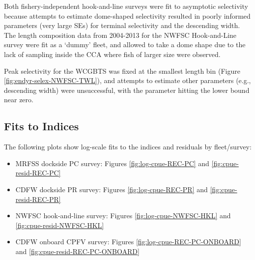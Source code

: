 \documentclass[11pt,
  english,
  a4paper,
]{article}
\begin{document}
Both fishery-independent hook-and-line surveys were fit to asymptotic selectivity because attempts to estimate dome-shaped selectivity resulted in poorly informed parameters (very large SEs) for terminal selectivity and the descending width. The length composition data from 2004-2013 for the NWFSC Hook-and-Line survey were fit as a `dummy' fleet, and allowed to take a dome shape due to the lack of sampling inside the CCA where fish of larger size were observed.

Peak selectivity for the WCGBTS was fixed at the smallest length bin (Figure \ref{fig:endyr-selex-NWFSC-TWL}), and attempts to estimate other parameters (e.g., descending width) were unsuccessful, with the parameter hitting the lower bound near zero.


\hypertarget{fits-to-indices}{%
\subsection{Fits to Indices}\label{fits-to-indices}}

\leavevmode\tagmcend\tagstructend

The following plots show log-scale fits to the indices and residuals by fleet/survey:


\begin{itemize}
\item

  MRFSS dockside PC survey: Figures \ref{fig:log-cpue-REC-PC} and \ref{fig:cpue-resid-REC-PC}\\

  \tagmcend\tagstructend\tagstructend
\item

  CDFW dockside PR survey: Figures \ref{fig:log-cpue-REC-PR} and \ref{fig:cpue-resid-REC-PR}\\

  \tagmcend\tagstructend\tagstructend
\item

  NWFSC hook-and-line survey: Figures \ref{fig:log-cpue-NWFSC-HKL} and \ref{fig:cpue-resid-NWFSC-HKL}\\

  \tagmcend\tagstructend\tagstructend
\item

  CDFW onboard CPFV survey: Figures \ref{fig:log-cpue-REC-PC-ONBOARD} and \ref{fig:cpue-resid-REC-PC-ONBOARD}

  \tagmcend\tagstructend\tagstructend
\end{itemize}
\end{document}
